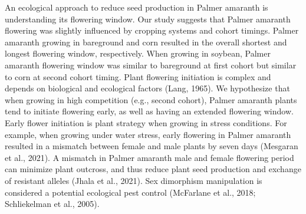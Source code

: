 \documentclass[utf8]{frontiersSCNS}
\begin{document}
An ecological approach to reduce seed production in Palmer amaranth is
understanding its flowering window. Our study suggests that Palmer
amaranth flowering was slightly influenced by cropping systems and
cohort timings. Palmer amaranth growing in bareground and corn resulted
in the overall shortest and longest flowering window, respectively. When
growing in soybean, Palmer amaranth flowering window was similar to
bareground at first cohort but similar to corn at second cohort timing.
Plant flowering initiation is complex and depends on biological and
ecological factors (Lang, 1965). We hypothesize that when growing in
high competition (e.g., second cohort), Palmer amaranth plants tend to
initiate flowering early, as well as having an extended flowering
window. Early flower initiation is plant strategy when growing in stress
conditions. For example, when growing under water stress, early
flowering in Palmer amaranth resulted in a mismatch between female and
male plants by seven days (Mesgaran et al., 2021). A mismatch in Palmer
amaranth male and female flowering period can minimize plant outcross,
and thus reduce plant seed production and exchange of resistant alleles
(Jhala et al., 2021). Sex dimorphism manipulation is considered a
potential ecological pest control (McFarlane et al., 2018; Schliekelman
et al., 2005).
\end{document}
